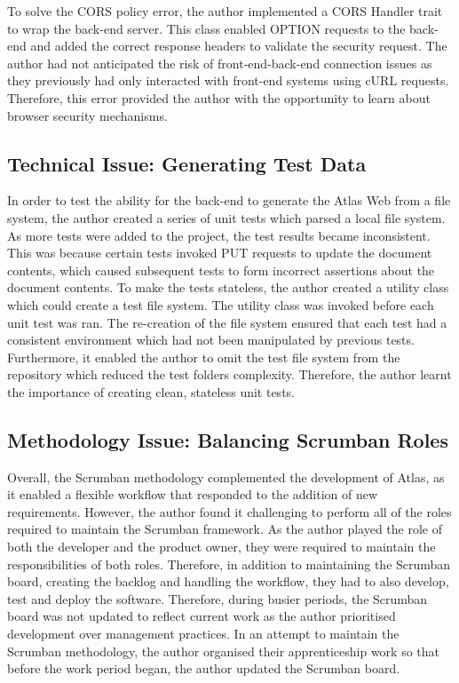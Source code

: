 \documentclass{article}
\begin{document}
To solve the CORS policy error, the author implemented a CORS Handler trait to wrap the back-end server. This class enabled OPTION requests to the back-end and added the correct response headers to validate the security request. The author had not anticipated the risk of front-end-back-end connection issues as they previously had only interacted with front-end systems using cURL requests. Therefore, this error provided the author with the opportunity to learn about browser security mechanisms. 

\subsection{Technical Issue: Generating Test Data}

In order to test the ability for the back-end to generate the Atlas Web from a file system, the author created a series of unit tests which parsed a local file system. As more tests were added to the project, the test results became inconsistent. This was because certain tests invoked PUT requests to update the document contents, which caused subsequent tests to form incorrect assertions about the document contents. To make the tests stateless, the author created a utility class which could create a test file system. The utility class was invoked before each unit test was ran. The re-creation of the file system ensured that each test had a consistent environment which had not been manipulated by previous tests. Furthermore, it enabled the author to omit the test file system from the repository which reduced the test folders complexity. Therefore, the author learnt the importance of creating clean, stateless unit tests.

\subsection{Methodology Issue: Balancing Scrumban Roles}

Overall, the Scrumban methodology complemented the development of Atlas, as it enabled a flexible workflow that responded to the addition of new requirements. However, the author found it challenging to perform all of the roles required to maintain the Scrumban framework. As the author played the role of both the developer and the product owner, they were required to maintain the responsibilities of both roles. Therefore, in addition to maintaining the Scrumban board, creating the backlog and handling the workflow, they had to also develop, test and deploy the software. Therefore, during busier periods, the Scrumban board was not updated to reflect current work as the author prioritised development over management practices. In an attempt to maintain the Scrumban methodology, the author organised their apprenticeship work so that before the work period began, the author updated the Scrumban board.
\end{document}
